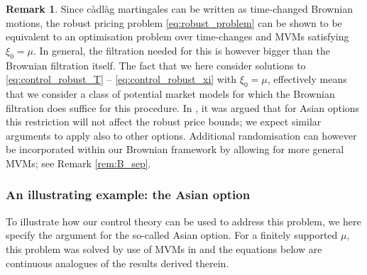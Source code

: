 \documentclass{article}
\theoremstyle{definition}
\newtheorem{remark}[theorem]{\textbf{Remark}}
\numberwithin{equation}{section}
\numberwithin{theorem}{section}
\newcommand{\cadlag}{c\`adl\`ag}
\begin{document}
	
	
	\begin{remark}\label{rem:B_robust}
		Since \cadlag{} martingales can be written as time-changed Brownian motions, the robust pricing problem \eqref{eq:robust_problem} can be shown to be equivalent to an optimisation problem over time-changes and MVMs satisfying $\xi_0=\mu$.
		In general, the filtration needed for this is however bigger than the Brownian filtration itself. The fact that we here consider solutions to \eqref{eq:control_robust_T} -- \eqref{eq:control_robust_xi} with $\xi_0=\mu$, effectively means that we consider a class of potential market models for which the Brownian filtration does suffice for this procedure.
		In \cite{cox2017}, it was argued that for Asian options this restriction will not affect the robust price bounds; we expect similar arguments to apply also to other options. 
		Additional randomisation can however be incorporated within our Brownian framework by allowing for more general MVMs; see Remark \ref{rem:B_sep}. 
	\end{remark}
	
	
    
    \subsubsection*{An illustrating example: the Asian option}
    
	To illustrate how our control theory can be used to address this problem, we here specify the argument for the so-called Asian option. For a finitely supported $\mu$, this problem was solved by use of MVMs in \cite{cox2017} and the equations below are continuous analogues of the results derived therein.
	
\end{document}
